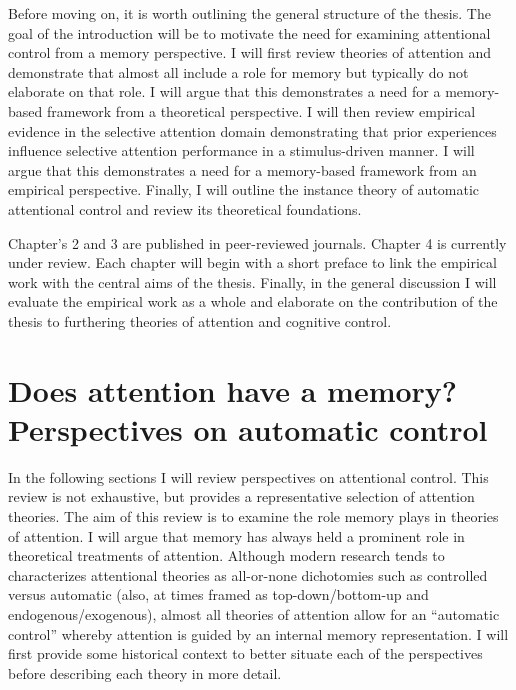 \documentclass[]{DissertateCUNY}
\begin{document}
Before moving on, it is worth outlining the general structure of the
thesis. The goal of the introduction will be to motivate the need for
examining attentional control from a memory perspective. I will first
review theories of attention and demonstrate that almost all include a
role for memory but typically do not elaborate on that role. I will
argue that this demonstrates a need for a memory-based framework from a
theoretical perspective. I will then review empirical evidence in the
selective attention domain demonstrating that prior experiences
influence selective attention performance in a stimulus-driven manner. I
will argue that this demonstrates a need for a memory-based framework
from an empirical perspective. Finally, I will outline the instance
theory of automatic attentional control and review its theoretical
foundations.

Chapter's 2 and 3 are published in peer-reviewed journals. Chapter 4 is
currently under review. Each chapter will begin with a short preface to
link the empirical work with the central aims of the thesis. Finally, in
the general discussion I will evaluate the empirical work as a whole and
elaborate on the contribution of the thesis to furthering theories of
attention and cognitive control.

\hypertarget{does-attention-have-a-memory-perspectives-on-automatic-control}{%
\section{Does attention have a memory? Perspectives on automatic
control}\label{does-attention-have-a-memory-perspectives-on-automatic-control}}

In the following sections I will review perspectives on attentional
control. This review is not exhaustive, but provides a representative
selection of attention theories. The aim of this review is to examine
the role memory plays in theories of attention. I will argue that memory
has always held a prominent role in theoretical treatments of attention.
Although modern research tends to characterizes attentional theories as
all-or-none dichotomies such as controlled versus automatic (also, at
times framed as top-down/bottom-up and endogenous/exogenous), almost all
theories of attention allow for an ``automatic control'' whereby
attention is guided by an internal memory representation. I will first
provide some historical context to better situate each of the
perspectives before describing each theory in more detail.
\end{document}
